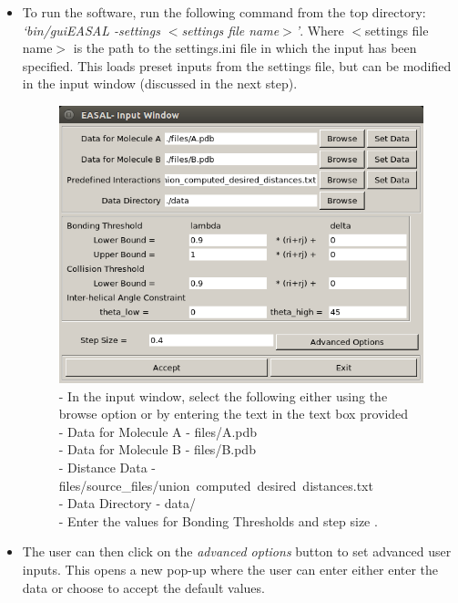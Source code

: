 \documentclass[10pt]{article}
\begin{document}
\begin{itemize}

\item To run the software, run the following command from the top directory:
\emph{`bin/guiEASAL -settings $<$settings file name$>$'}.  Where $<$settings file
name$>$ is the path to the settings.ini file in which the input has been
specified. This loads preset inputs from the settings file, but can be modified
in the input window (discussed in the next step).


\begin{figure}
	\centering
	\includegraphics[scale=0.5] {fig/InputWindow.png}
	\caption{- In the input window, select the following either using the
	browse option or by entering the text in the text box provided\\
    - Data for Molecule A - files/A.pdb\\
    - Data for Molecule B - files/B.pdb\\
    - Distance Data - files/source\_files/union\ computed\ desired\ distances.txt\\
    - Data Directory - data/\\
    - Enter the values for Bonding Thresholds and step size .
}
	\label{inputwindow}
\end{figure}


\item The user can then click on the \emph{advanced options} button to set
advanced user inputs. This opens a new pop-up where the user can enter either
enter the data or choose to accept the default values.


\end{itemize}
\end{document}
